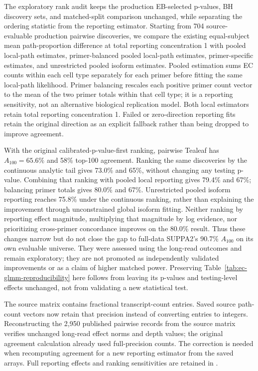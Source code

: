 \documentclass[11pt]{article}
\begin{document}
The exploratory rank audit keeps the production EB-selected p-values, BH discovery sets, and matched-split comparison unchanged, while separating the ordering statistic from the reporting estimator. Starting from 704 source-evaluable production pairwise discoveries, we compare the existing equal-subject mean path-proportion difference at total reporting concentration 1 with pooled local-path estimates, primer-balanced pooled local-path estimates, primer-specific estimates, and unrestricted pooled isoform estimates. Pooled estimation sums EC counts within each cell type separately for each primer before fitting the same local-path likelihood. Primer balancing rescales each positive primer count vector to the mean of the two primer totals within that cell type; it is a reporting sensitivity, not an alternative biological replication model. Both local estimators retain total reporting concentration 1. Failed or zero-direction reporting fits retain the original direction as an explicit fallback rather than being dropped to improve agreement.

With the original calibrated-p-value-first ranking, pairwise Tealeaf has \(A_{100}=65.6\%\) and 58\% top-100 agreement. Ranking the same discoveries by the continuous analytic tail gives 73.0\% and 65\%, without changing any testing p-value. Combining that ranking with pooled local reporting gives 79.4\% and 67\%; balancing primer totals gives 80.0\% and 67\%. Unrestricted pooled isoform reporting reaches 75.8\% under the continuous ranking, rather than explaining the improvement through unconstrained global isoform fitting. Neither ranking by reporting effect magnitude, multiplying that magnitude by log evidence, nor prioritizing cross-primer concordance improves on the 80.0\% result. Thus these changes narrow but do not close the gap to full-data SUPPA2's 90.7\% \(A_{100}\) on its own evaluable universe. They were assessed using the long-read outcomes and remain exploratory; they are not promoted as independently validated improvements or as a claim of higher matched power. Preserving Table~\ref{tab:ec-glmm-reproducibility} here follows from leaving its p-values and testing-level effects unchanged, not from validating a new statistical test.

The source matrix contains fractional transcript-count entries. Saved source path-count vectors now retain that precision instead of converting entries to integers. Reconstructing the 2,950 published pairwise records from the source matrix verifies unchanged long-read effect norms and depth values; the original agreement calculation already used full-precision counts. The correction is needed when recomputing agreement for a new reporting estimator from the saved arrays. Full reporting effects and ranking sensitivities are retained in .
\end{document}
